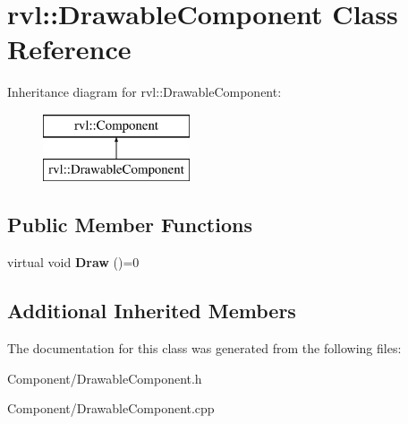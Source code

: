 \hypertarget{classrvl_1_1_drawable_component}{}\section{rvl\+:\+:Drawable\+Component Class Reference}
\label{classrvl_1_1_drawable_component}
Inheritance diagram for rvl\+:\+:Drawable\+Component\+:\begin{figure}[H]
\begin{center}
\leavevmode
\includegraphics[height=2.000000cm]{classrvl_1_1_drawable_component}
\end{center}
\end{figure}
\subsection*{Public Member Functions}
\begin{DoxyCompactItemize}
\item 
\mbox{\label{classrvl_1_1_drawable_component_a98aae95129af2f5c17ba9df97e7e954f}} 
virtual void {\bfseries Draw} ()=0
\end{DoxyCompactItemize}
\subsection*{Additional Inherited Members}


The documentation for this class was generated from the following files\+:\begin{DoxyCompactItemize}
\item 
Component/Drawable\+Component.\+h\item 
Component/Drawable\+Component.\+cpp\end{DoxyCompactItemize}
